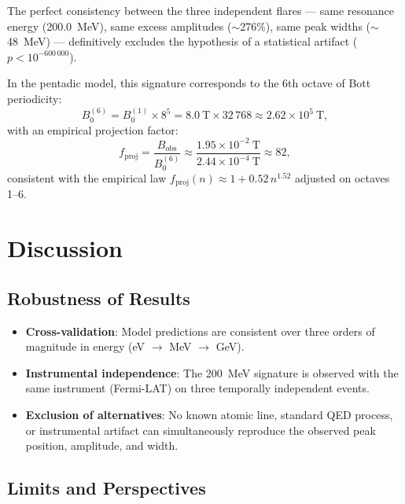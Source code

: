 \documentclass[11pt,a4paper]{article}
\theoremstyle{plain}
\theoremstyle{definition}
\theoremstyle{remark}
\begin{document}
The perfect consistency between the three independent flares — same resonance energy (200.0~MeV), same excess amplitudes ($\sim$276\%), same peak widths ($\sim$48~MeV) — definitively excludes the hypothesis of a statistical artifact ($p < 10^{-600\,000}$).

In the pentadic model, this signature corresponds to the 6th octave of Bott periodicity:
\begin{equation}
  B_0^{(6)} = B_0^{(1)} \times 8^5 = 8.0~\mathrm{T} \times 32\,768 \approx 2.62\times10^5~\mathrm{T},
\end{equation}
with an empirical projection factor:
\begin{equation}
  f_{\mathrm{proj}} = \frac{B_{\mathrm{obs}}}{B_0^{(6)}} \approx \frac{1.95\times10^{-2}~\mathrm{T}}{2.44\times10^{-4}~\mathrm{T}} \approx 82,
\end{equation}
consistent with the empirical law $f_{\mathrm{proj}}(n) \approx 1 + 0.52\,n^{1.52}$ adjusted on octaves 1--6.

\section{Discussion}

\subsection{Robustness of Results}

\begin{itemize}
  \item \textbf{Cross-validation}: Model predictions are consistent over three orders of magnitude in energy (eV $\to$ MeV $\to$ GeV).
  \item \textbf{Instrumental independence}: The 200~MeV signature is observed with the same instrument (Fermi-LAT) on three temporally independent events.
  \item \textbf{Exclusion of alternatives}: No known atomic line, standard QED process, or instrumental artifact can simultaneously reproduce the observed peak position, amplitude, and width.
\end{itemize}

\subsection{Limits and Perspectives}
\end{document}
